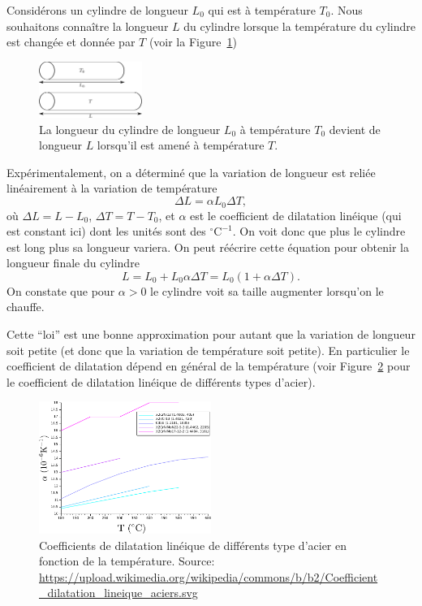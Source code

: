 \documentclass[a4paper,12pt]{book}
\newcommand{\C}{\mathrm{C}}
\begin{document}
Considérons un cylindre de longueur $L_0$ qui est à température $T_0$. 
Nous souhaitons connaître la longueur $L$ du cylindre lorsque la température du cylindre est changée 
et donnée par $T$ (voir la Figure~\ref{fig_rods})
\begin{figure}
\begin{center}
\includegraphics[width=0.3\textwidth]{figs/rods.pdf}
\caption{La longueur du cylindre de longueur $L_0$ à température $T_0$ devient de longueur $L$ lorsqu'il est 
amené à température $T$.}
\label{fig_rods}
\end{center}
\end{figure}
Expérimentalement, on a déterminé que la variation de longueur est reliée linéairement à la variation de température
\begin{equation} 
\Delta L=\alpha L_0\Delta T,\label{eq_dl_dt}
\end{equation}
où $\Delta L=L-L_0$, $\Delta T=T-T_0$, et $\alpha$ est le coefficient de dilatation linéique (qui est constant ici)
dont les unités sont des $^\circ \C^{-1}$. On voit donc que
plus le cylindre est long plus sa longueur variera.
On peut réécrire cette équation pour obtenir 
la longueur finale du cylindre
\begin{equation}
L=L_0+L_0\alpha\Delta T=L_0\left(1+\alpha \Delta T\right).
\end{equation}
On constate que pour $\alpha>0$ le cylindre voit sa taille augmenter lorsqu'on le chauffe.

Cette ``loi'' est une bonne approximation pour autant que
la variation de longueur soit petite (et donc que la 
variation de température soit petite). En particulier
le coefficient de dilatation dépend en général de la
température (voir Figure~\ref{fig_alpha_aciers} pour le coefficient de dilatation linéique de différents types d'acier).
\begin{figure}
\begin{center}
\includegraphics[width=0.5\textwidth]{figs/alpha_aciers.pdf}
\caption{Coefficients de dilatation linéique de différents type d'acier en fonction de la température. Source: \url{https://upload.wikimedia.org/wikipedia/commons/b/b2/Coefficient_dilatation_lineique_aciers.svg}}
\label{fig_alpha_aciers}
\end{center}
\end{figure}
\end{document}
